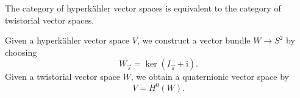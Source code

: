 \documentclass[12pt,letterpaper,reqno]{article}
\numberwithin{equation}{section}
\newcommand{\hk}{hyperk\"ahler\xspace}
\newcommand{\I}{{\mathrm i}}
\newcommand{\fixme}[1]{{\color{blue}{[#1]}}}
\begin{document}
\begin{prop} 
The category of \hk vector spaces
is equivalent to the category of twistorial vector spaces.
\end{prop}

\begin{pf} Given a \hk vector space $V$, we
construct a vector bundle $W \to S^2$ by
choosing
\begin{equation}
 W_{\vec s} = \ker(I_{\vec s} + \I).
\end{equation}
Given a twistorial vector space $W$,
we obtain a quaternionic vector space
by
\begin{equation}
  V = H^0(W).
\end{equation}
\fixme{...}
\end{pf}
\end{document}
